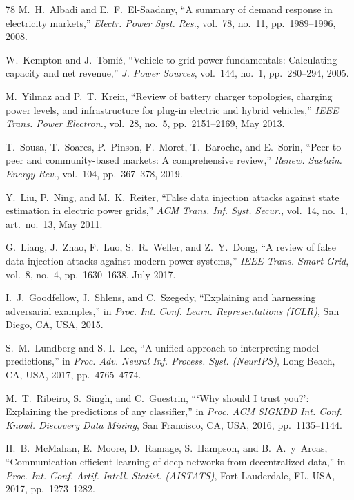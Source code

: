 \documentclass[journal]{IEEEtran}
\begin{document}
\begin{thebibliography}{78}
 M.~H.~Albadi and E.~F.~El-Saadany, ``A summary of demand response in electricity markets,'' \textit{Electr. Power Syst. Res.}, vol.~78, no.~11, pp.~1989--1996, 2008.

 W.~Kempton and J.~Tomi\'{c}, ``Vehicle-to-grid power fundamentals: Calculating capacity and net revenue,'' \textit{J. Power Sources}, vol.~144, no.~1, pp.~280--294, 2005.

 M.~Yilmaz and P.~T.~Krein, ``Review of battery charger topologies, charging power levels, and infrastructure for plug-in electric and hybrid vehicles,'' \textit{IEEE Trans. Power Electron.}, vol.~28, no.~5, pp.~2151--2169, May 2013.

 T.~Sousa, T.~Soares, P.~Pinson, F.~Moret, T.~Baroche, and E.~Sorin, ``Peer-to-peer and community-based markets: A comprehensive review,'' \textit{Renew. Sustain. Energy Rev.}, vol.~104, pp.~367--378, 2019.

 Y.~Liu, P.~Ning, and M.~K.~Reiter, ``False data injection attacks against state estimation in electric power grids,'' \textit{ACM Trans. Inf. Syst. Secur.}, vol.~14, no.~1, art.~no.~13, May 2011.

 G.~Liang, J.~Zhao, F.~Luo, S.~R.~Weller, and Z.~Y.~Dong, ``A review of false data injection attacks against modern power systems,'' \textit{IEEE Trans. Smart Grid}, vol.~8, no.~4, pp.~1630--1638, July 2017.

 I.~J.~Goodfellow, J.~Shlens, and C.~Szegedy, ``Explaining and harnessing adversarial examples,'' in \textit{Proc. Int. Conf. Learn. Representations (ICLR)}, San Diego, CA, USA, 2015.

 S.~M.~Lundberg and S.-I.~Lee, ``A unified approach to interpreting model predictions,'' in \textit{Proc. Adv. Neural Inf. Process. Syst. (NeurIPS)}, Long Beach, CA, USA, 2017, pp.~4765--4774.

 M.~T.~Ribeiro, S.~Singh, and C.~Guestrin, ```Why should I trust you?': Explaining the predictions of any classifier,'' in \textit{Proc. ACM SIGKDD Int. Conf. Knowl. Discovery Data Mining}, San Francisco, CA, USA, 2016, pp.~1135--1144.

 H.~B.~McMahan, E.~Moore, D.~Ramage, S.~Hampson, and B.~A.~y~Arcas, ``Communication-efficient learning of deep networks from decentralized data,'' in \textit{Proc. Int. Conf. Artif. Intell. Statist. (AISTATS)}, Fort Lauderdale, FL, USA, 2017, pp.~1273--1282.


\end{thebibliography}
\end{document}
